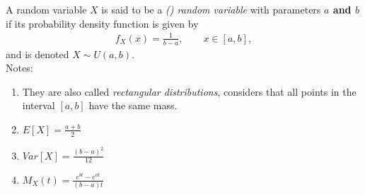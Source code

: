 \documentclass{article}
\begin{document}
A random variable $X$ is said to be a \emph{ () random variable} with parameters \textbf{$a$ and $b$} if its probability density function is given by
\begin{align*}
f_X(x) = \frac{1}{b-a},\quad\quad x \in [a,b],
\end{align*}
and is denoted $X\sim U(a,b)$.\\

Notes:
\begin{enumerate}
\item They are also called \emph{rectangular distributions}, considers that all points in the interval $[a,b]$ have the same mass.
\item $E[X] = \frac{a+b}{2}$
\item $Var[X] = \frac{(b-a)^2}{12}$
\item $M_X(t) = \frac{e^{bt} - e^{at}}{(b-a)t}$

\end{enumerate}
\end{document}
